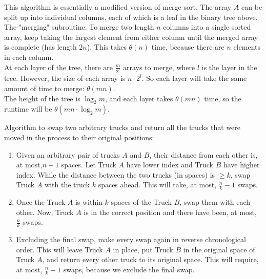 \documentclass[12pt,twoside]{article}
\begin{document}
\begin{problems}
\begin{problemparts}
\bigskip

This algorithm is essentially a modified version of merge sort. The array $A$ can be split up into individual columns, each of which is a leaf in the binary tree above. \\

The "merging" subroutine: To merge two length $n$ columns into a single sorted array, keep taking the largest element from either column until the merged array is complete (has length $2n$). This takes $\theta(n)$ time, because there are $n$ elements in each column. \\

At each layer of the tree, there are $\frac{m}{2^l}$ arrays to merge, where $l$ is the layer in the tree. However, the size of each array is $n \cdot 2^l$. So each layer will take the same amount of time to merge: $\theta(mn)$. \\

The height of the tree is $\log_2 m$, and each layer takes $\theta(mn)$ time, so the runtime will be $\theta(mn \cdot \log_2 m)$.

\end{problemparts}



\problem  %

\begin{problemparts}
\problempart Algorithm to swap two arbitrary trucks and return all the trucks that were moved in the process to their original positions:

\begin{enumerate}
\item Given an arbitrary pair of trucks $A$ and $B$, their distance from each other is, at most,$n-1$ spaces. Let Truck $A$ have lower index and Truck $B$ have higher index. While the distance between the two trucks (in spaces) is $\geq k$, swap Truck $A$ with the truck $k$ spaces ahead. This will take, at most, $\frac{n}{k}-1$ swaps.
\item Once the Truck $A$ is within $k$ spaces of the Truck $B$, swap them with each other. Now, Truck $A$ is in the correct position and there have been, at most, $\frac{n}{k}$ swaps.
\item Excluding the final swap, make every swap again in reverse chronological order. This will leave Truck $A$ in place, put Truck $B$ in the original space of Truck $A$, and return every other truck to its original space. This will require, at most, $\frac{n}{k}-1$ swaps, because we exclude the final swap.


\end{enumerate}
\end{problemparts}
\end{problems}
\end{document}
